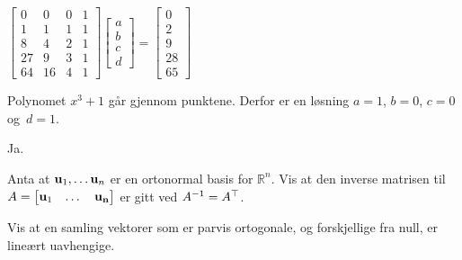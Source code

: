 \begin{losning}

\begin{punkt}
$
\begin{bmatrix}
0 & 0 & 0 & 1\\
1 & 1 & 1 & 1\\
8 & 4 & 2 & 1\\
27 & 9 & 3 & 1\\
64 & 16 & 4 & 1
\end{bmatrix}\begin{bmatrix}
a\\
b\\
c\\
d
\end{bmatrix}=\begin{bmatrix}
0\\
2\\
9\\
28\\
65
\end{bmatrix}$
\end{punkt}

\begin{punkt}
Polynomet $x^3+1$ går gjennom punktene. Derfor er en løsning $a=1$, $b=0$, $c=0$ og~$d=1$.
\end{punkt}

\begin{punkt}
Ja.
\end{punkt}

\end{losning}

%
%


\begin{oppgave}
Anta at $\mathbf{u}_1,\dots \mathbf{u}_n$ er en ortonormal basis for $\mathbb{R}^n$. Vis at den inverse matrisen til $A=\begin{bmatrix}
\mathbf{u}_1 & \dots & \mathbf{u_n}
\end{bmatrix}$ er gitt ved $A^{-1}=A^\top$.
\end{oppgave}

\begin{oppgave}
Vis at en samling vektorer som er parvis ortogonale, og forskjellige fra null, er lineært uavhengige.
\end{oppgave}


